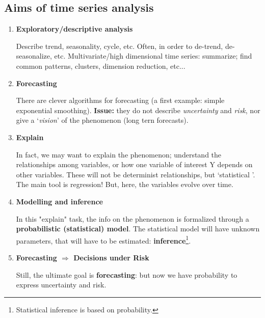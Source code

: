 \documentclass[dvipsnames,12pt]{book}
\begin{document}
            \subsection{Aims of time series analysis}

                \begin{enumerate}
                    \item \textbf{Exploratory/descriptive analysis}
    
                        Describe trend, seasonality, cycle, etc. 
                        Often, in order to de-trend, de-seasonalize, etc.
                        Multivariate/high dimensional time series: summarize; find common patterns, clusters, dimension reduction, etc...
                        
                    \item \textbf{Forecasting}
    
                        There are clever algorithms for forecasting (a first example: simple exponential smoothing).
                        \textbf{Issue:} they do not describe \textit{uncertainty} and \textit{risk}, nor give a ‘\textit{vision}’ of the phenomenon (long tern forecasts).
                    
                    \item \textbf{Explain}
    
                        In fact, we may want to explain the phenomenon; understand the relationships among variables, or how one variable of interest Y depends on other variables. These will not be determinist relationships, but ‘statistical ’. The main tool is regression! But, here, the variables evolve over time.
    
                    \item \textbf{Modelling and inference}
    
                        In this "explain" task, the info on the phenomenon is formalized through a \textbf{probabilistic (statistical) model}. The statistical model will have unknown parameters, that will have to be estimated: \textbf{inference}\footnote{Statistical inference is based on probability.}.
    
                    \item \textbf{Forecasting \(\Rightarrow\) Decisions under Risk}
    
                        Still, the ultimate goal is \textbf{forecasting}: but now we have probability to express uncertainty and risk.
                        
                \end{enumerate}
    
\end{document}
